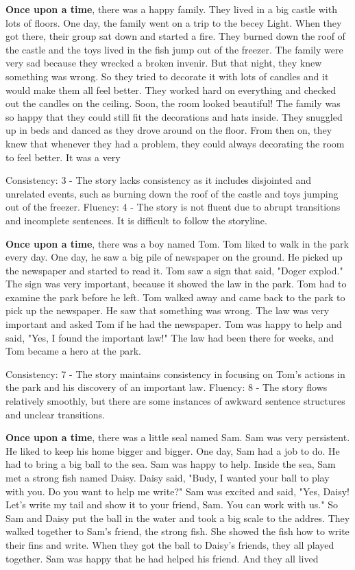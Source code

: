\documentclass{article}
\begin{document}
\textbf{Once upon a time}, there was a happy family. They lived in a big castle with lots of floors. One day, the family went on a trip to the becey Light. When they got there, their group sat down and started a fire. They burned down the roof of the castle and the toys lived in the fish jump out of the freezer. The family were very sad because they wrecked a broken invenir. But that night, they knew something was wrong. So they tried to decorate it with lots of candles and it would make them all feel better. They worked hard on everything and checked out the candles on the ceiling. Soon, the room looked beautiful! The family was so happy that they could still fit the decorations and hats inside. They snuggled up in beds and danced as they drove around on the floor. From then on, they knew that whenever they had a problem, they could always decorating the room to feel better. It was a very

Consistency: 3 - The story lacks consistency as it includes disjointed and unrelated events, such as burning down the roof of the castle and toys jumping out of the freezer.
Fluency: 4 - The story is not fluent due to abrupt transitions and incomplete sentences. It is difficult to follow the storyline.

\textbf{Once upon a time}, there was a boy named Tom. Tom liked to walk in the park every day. One day, he saw a big pile of newspaper on the ground. He picked up the newspaper and started to read it. Tom saw a sign that said, "Doger explod." The sign was very important, because it showed the law in the park. Tom had to examine the park before he left. Tom walked away and came back to the park to pick up the newspaper. He saw that something was wrong. The law was very important and asked Tom if he had the newspaper. Tom was happy to help and said, "Yes, I found the important law!" The law had been there for weeks, and Tom became a hero at the park.

Consistency: 7 - The story maintains consistency in focusing on Tom's actions in the park and his discovery of an important law.
Fluency: 8 - The story flows relatively smoothly, but there are some instances of awkward sentence structures and unclear transitions.

\textbf{Once upon a time}, there was a little seal named Sam. Sam was very persistent. He liked to keep his home bigger and bigger. One day, Sam had a job to do. He had to bring a big ball to the sea. Sam was happy to help. Inside the sea, Sam met a strong fish named Daisy. Daisy said, "Budy, I wanted your ball to play with you. Do you want to help me write?" Sam was excited and said, "Yes, Daisy! Let's write my tail and show it to your friend, Sam. You can work with us." So Sam and Daisy put the ball in the water and took a big scale to the addres. They walked together to Sam's friend, the strong fish. She showed the fish how to write their fins and write. When they got the ball to Daisy's friends, they all played together. Sam was happy that he had helped his friend. And they all lived
\end{document}
